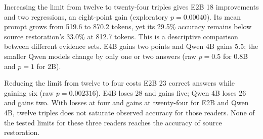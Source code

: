 \begin{table}[htbp]
  \centering
  \scriptsize
  \setlength{\tabcolsep}{4pt}
  \caption{Graph-depth controls on 200 paired LoCoMo questions. Each reader's v3 graph
  is fixed; only the maximum number of retrieved triples changes. Tokens are mean
  whole-prompt counts. Vector retrieval is the reference from Chapter~\ref{ch:memory_evaluation}.
  The four-triple condition was not run for the two smallest Qwen models (n/a);
  dashes indicate token means omitted from this table.}
  \label{tab:ch6_depth}
\end{table}

Increasing the limit from twelve to twenty-four triples gives E2B 18 improvements and two
regressions, an eight-point gain (exploratory $p=0.00040$). Its mean prompt grows from
519.6 to 870.2 tokens, yet its 29.5\% accuracy remains below source restoration's 33.0\%
at 812.7 tokens. This is a descriptive comparison between different evidence sets.
E4B gains two points and Qwen 4B gains 5.5; the smaller Qwen models change by only one
or two answers (raw $p=0.5$ for 0.8B and $p=1$ for 2B).

Reducing the limit from twelve to four costs E2B 23 correct answers while gaining six
(raw $p=0.002316$). E4B loses 28 and gains five; Qwen 4B loses 26 and gains two.
With losses at four and gains at twenty-four for E2B and Qwen 4B, twelve triples does
not saturate observed accuracy for those readers. None of the tested limits
for these three readers reaches the accuracy of source restoration.

